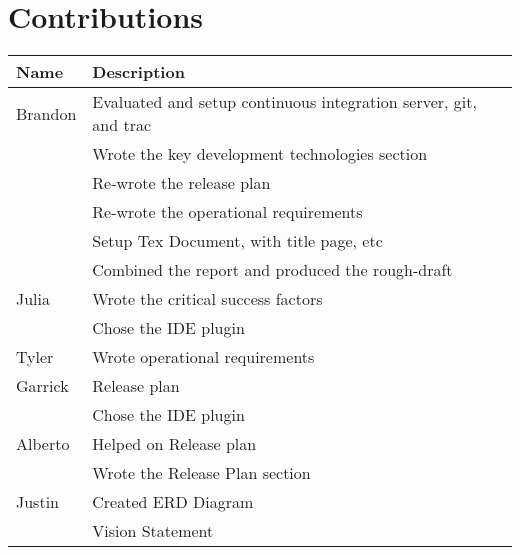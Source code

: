 \section{Contributions}
\begin{tabular}{| l | l |}
\hline
Name & Description \\
\hline
Brandon & Evaluated and setup continuous integration server, git, and trac\\
 & Wrote the key development technologies section \\
 & Re-wrote the release plan \\
 & Re-wrote the operational requirements \\
 & Setup Tex Document, with title page, etc \\
 & Combined the report and produced the rough-draft \\
\hline
Julia & Wrote the critical success factors \\
 & Chose the IDE plugin \\
\hline
Tyler & Wrote operational requirements \\
\hline
Garrick & Release plan \\
 & Chose the IDE plugin \\
\hline
Alberto & Helped on Release plan  \\
& Wrote the Release Plan section \\
\hline
Justin & Created ERD Diagram \\
& Vision Statement \\
\hline
\end{tabular}
